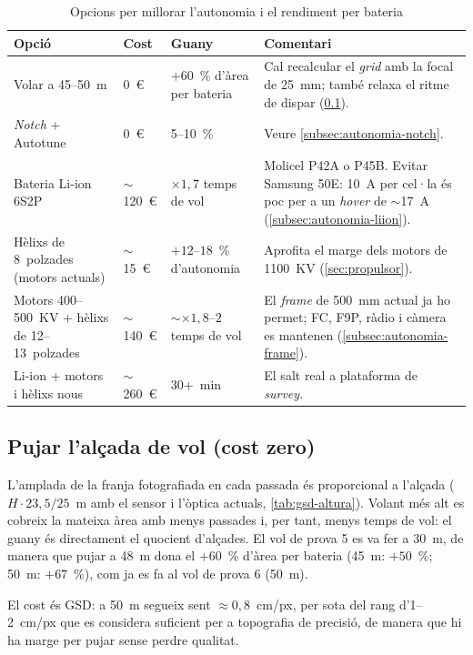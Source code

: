 \begin{table}[H]
    \centering
    \caption{Opcions per millorar l'autonomia i el rendiment per bateria}
    \label{tab:opcions-autonomia}
    \small
    \begin{tabular}{P{3.4cm}P{1.7cm}P{2.5cm}P{5.9cm}}
        \toprule
        Opció & Cost & Guany & Comentari \\
        \midrule
        Volar a 45--50~m & 0~€ & $+60$~\% d'àrea per bateria & Cal recalcular el \emph{grid} amb la focal de 25~mm; també relaxa el ritme de dispar (\cref{subsec:autonomia-altura}). \\
        \emph{Notch} + Autotune & 0~€ & 5--10~\% & Veure \cref{subsec:autonomia-notch}. \\
        Bateria Li-ion 6S2P & $\sim$120~€ & $\times 1{,}7$ temps de vol & Molicel P42A o P45B. Evitar Samsung 50E: 10~A per cel·la és poc per a un \emph{hover} de $\sim$17~A (\cref{subsec:autonomia-liion}). \\
        Hèlixs de 8~polzades (motors actuals) & $\sim$15~€ & $+12$--$18$~\% d'autonomia & Aprofita el marge dels motors de 1100~KV (\cref{sec:propulsor}). \\
        Motors 400--500~KV + hèlixs de 12--13~polzades & $\sim$140~€ & $\sim\times 1{,}8$--$2$ temps de vol & El \emph{frame} de 500~mm actual ja ho permet; FC, F9P, ràdio i càmera es mantenen (\cref{subsec:autonomia-frame}). \\
        Li-ion + motors i hèlixs nous & $\sim$260~€ & 30+~min & El salt real a plataforma de \emph{survey}. \\
        \bottomrule
    \end{tabular}
\end{table}

\subsection{Pujar l'alçada de vol (cost zero)}
\label{subsec:autonomia-altura}

L'amplada de la franja fotografiada en cada passada és proporcional a l'alçada ($H \cdot 23{,}5/25$~m amb el sensor i l'òptica actuals, \cref{tab:gsd-altura}). Volant més alt es cobreix la mateixa àrea amb menys passades i, per tant, menys temps de vol: el guany és directament el quocient d'alçades. El vol de prova 5 es va fer a 30~m, de manera que pujar a 48~m dona el $+60$~\% d'àrea per bateria (45~m: $+50$~\%; 50~m: $+67$~\%), com ja es fa al vol de prova 6 (50~m).

El cost és GSD: a 50~m segueix sent $\approx 0{,}8$~cm/px, per sota del rang d'1--2~cm/px que es considera suficient per a topografia de precisió, de manera que hi ha marge per pujar sense perdre qualitat.

